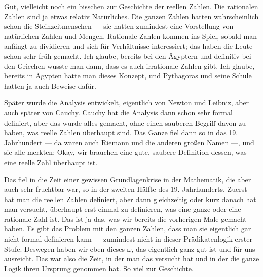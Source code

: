 \begin{spoken-clean}[00:10:45 - 00:13:30]
Gut, vielleicht noch ein bisschen zur Geschichte der reellen Zahlen. Die rationalen Zahlen sind ja etwas relativ Natürliches. Die ganzen Zahlen hatten wahrscheinlich schon die Steinzeitmenschen --- sie hatten zumindest eine Vorstellung von natürlichen Zahlen und Mengen. Rationale Zahlen kommen ins Spiel, sobald man anfängt zu dividieren und sich für Verhältnisse interessiert; das haben die Leute schon sehr früh gemacht. Ich glaube, bereits bei den Ägyptern und definitiv bei den Griechen wusste man dann, dass es auch irrationale Zahlen gibt. Ich glaube, bereits in Ägypten hatte man dieses Konzept, und Pythagoras und seine Schule hatten ja auch Beweise dafür.

Später wurde die Analysis entwickelt, eigentlich von Newton und Leibniz, aber auch später von Cauchy. Cauchy hat die Analysis dann schon sehr formal definiert, aber das wurde alles gemacht, ohne einen sauberen Begriff davon zu haben, was reelle Zahlen überhaupt sind. Das Ganze fiel dann so in das 19. Jahrhundert --- da waren auch Riemann und die anderen großen Namen ---, und sie alle merkten: Okay, wir brauchen eine gute, saubere Definition dessen, was eine reelle Zahl überhaupt ist.

Das fiel in die Zeit einer gewissen Grundlagenkrise in der Mathematik, die aber auch sehr fruchtbar war, so in der zweiten Hälfte des 19. Jahrhunderts. Zuerst hat man die reellen Zahlen definiert, aber dann gleichzeitig oder kurz danach hat man versucht, überhaupt erst einmal zu definieren, was eine ganze oder eine rationale Zahl ist. Das ist ja das, was wir bereits die vorherigen Male gemacht haben. Es gibt das Problem mit den ganzen Zahlen, dass man sie eigentlich gar nicht formal definieren kann --- zumindest nicht in dieser Prädikatenlogik erster Stufe. Deswegen haben wir eben dieses $\omega$, das eigentlich ganz gut ist und für uns ausreicht. Das war also die Zeit, in der man das versucht hat und in der die ganze Logik ihren Ursprung genommen hat. So viel zur Geschichte.
\end{spoken-clean}

\begin{ai-global-state-checkpoint-invisible-content}
\end{ai-global-state-checkpoint-invisible-content}

